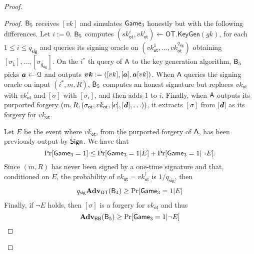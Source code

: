 \begin{proof}
\begin{proof}
$\mathsf{B}_5$ receives $[vk]$ and simulates $\mathsf{Game}_3$ honestly but with the following differences. Let $i:=0$. $\mathsf{B}_5$ computes $(sk_\mathsf{ot}^i,vk_\mathsf{ot}^i)\gets\mathsf{OT}.\mathsf{KeyGen}(gk)$, for each $1\leq i\leq q_\mathsf{sig}$ and queries its signing oracle on $(vk_{\mathsf{ot}}^1,\ldots,vk_\mathsf{ot}^{q_{\mathsf{sig}}})$ obtaining $[\sigma_1],\ldots,[\sigma_{q_\mathsf{sig}}]$. On the $i^*$ th query of $\mathsf{A}$ to the key generation algorithm, $\mathsf{B}_5$ picks ${\boldsymbol{a}}\gets\mathcal{Q}$ and outputs ${\boldsymbol{vk}}:=([vk],[{\boldsymbol{a}}],{\boldsymbol{a}}[vk])$. When $\mathsf{A}$ queries the signing oracle on input $(i^*,m,R)$, $\mathsf{B}_5$ computes an honest signature but replaces $vk_\mathsf{ot}$ with $vk_\mathsf{ot}^i$ and $[\sigma]$ with $[\sigma_i]$, and then adds 1 to $i$. Finally, when $\mathsf{A}$ outputs its purported forgery $(m,R,(\sigma_\mathsf{ot},vk_\mathsf{ot},[{\boldsymbol{c}}],[{\boldsymbol{d}}],\ldots))$, it extracts $[\sigma]$ from $[{\boldsymbol{d}}]$ as its forgery for $vk_\mathsf{ot}$.

Let $E$ be the event where $vk_\mathsf{ot}$, from the purported forgery of $\mathsf{A}$, has been previously output by $\mathsf{Sign}$. We have that
$$
\Pr[\mathsf{Game}_3=1]\leq \Pr[\mathsf{Game}_3=1|E]+\Pr[\mathsf{Game}_3=1|\neg E].
$$
Since  $(m,R)$ has never been signed by a one-time signature and that, conditioned on $E$, the probability of $vk_\mathsf{ot}=vk_\mathsf{ot}^\dag$ is $1/q_\mathsf{sig}$, then
\begin{align*}
q_{\mathsf{sig}}\mathbf{Adv}_\mathsf{OT}(\mathsf{B}_4)\geq  \Pr[\mathsf{Game}_3=1|E]
\end{align*}
Finally, if $\neg E$ holds, then $[\sigma]$ is a forgery for $vk_\mathsf{ot}$ and thus
$$
\mathbf{Adv}_{\mathsf{BB}}(\mathsf{B}_5)\geq \Pr[\mathsf{Game}_3=1|\neg E]$$
\end{proof}
\end{proof}
